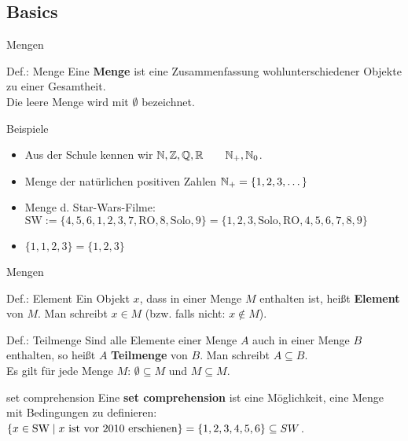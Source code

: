 \subsection{Basics}
	\begin{frame}{Mengen}
		\begin{block}{Def.: Menge}
			Eine \textbf{Menge} ist eine Zusammenfassung wohlunterschiedener Objekte zu einer Gesamtheit.\\
			Die leere Menge wird mit $\emptyset$ bezeichnet.\\
		\end{block}
		\pause
		\begin{exampleblock}{Beispiele}
			\begin{itemize}
				\item Aus der Schule kennen wir \qquad $\mathbb{N}, \mathbb{Z}, \mathbb{Q}, \mathbb{R} \qquad \mathbb{N}_+, \mathbb{N}_0$.
				\item Menge der natürlichen positiven Zahlen $\mathbb{N}_+ = \{1,2,3,\dots\}$
				\item Menge d. Star-Wars-Filme: $\text{SW}:=\{4,5,6,1,2,3,7,\text{RO},8,\text{Solo},9\} = \{1,2,3,\text{Solo},\text{RO},4,5,6,7,8,9\}$
				\item $\{1,1,2,3\} = \{1,2,3\}$
			\end{itemize}
		\end{exampleblock}
	\end{frame}

	\begin{frame}{Mengen}
		\begin{block}{Def.: Element}
			Ein Objekt $x$, dass in einer Menge $M$ enthalten ist, heißt \textbf{Element} von $M$. Man schreibt $x \in M$ (bzw. falls nicht: $x \notin M$).			
		\end{block}

		\begin{block}{Def.: Teilmenge}
			Sind alle Elemente einer Menge $A$ auch in einer Menge $B$ enthalten, so heißt $A$ \textbf{Teilmenge} von $B$. Man schreibt $A \subseteq B$.\\
			Es gilt für jede Menge $M$: $\emptyset \subseteq M$ und $M \subseteq M$.
		\end{block}
		\pause
		\begin{block}{set comprehension}
			Eine \textbf{set comprehension} ist eine Möglichkeit, eine Menge mit Bedingungen zu definieren:\\
			$\left\{ x \in \text{SW} \mid x \text{ ist vor 2010 erschienen} \right\} = \left\{ 1,2,3,4,5,6 \right\} \subseteq SW$.
		\end{block}
	\end{frame}

